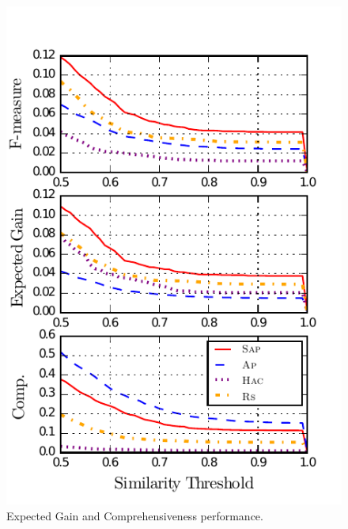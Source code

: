 \begin{figure}
 \center
 \includegraphics[scale=1.0]{feature_based_salience_models/figures/nuggets-metrics3.pdf}
 \caption{Expected Gain and Comprehensiveness performance.}
 \label{fig:3_aps_autots}
\end{figure}
